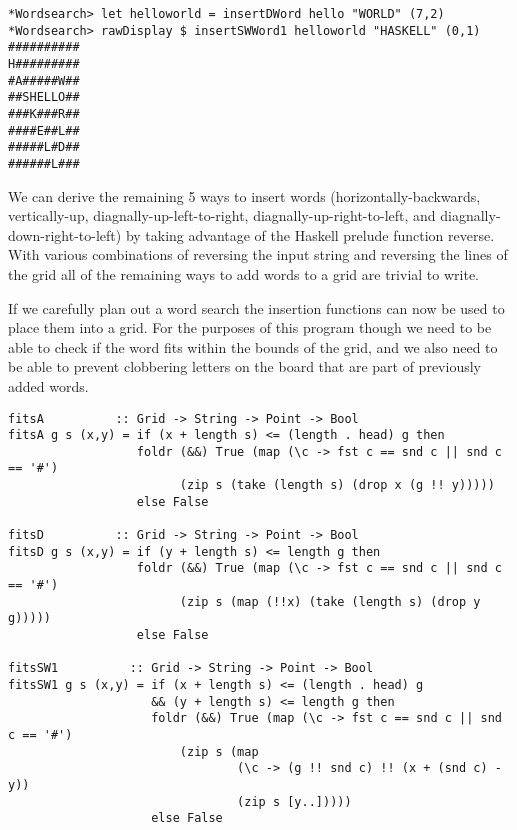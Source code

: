 \documentclass[12pt]{report}   %
\begin{document}
    \vspace{12pt}
    \pagebreak

    \begin{lstlisting}
*Wordsearch> let helloworld = insertDWord hello "WORLD" (7,2) 
*Wordsearch> rawDisplay $ insertSWWord1 helloworld "HASKELL" (0,1)
##########
H#########
#A#####W##
##SHELLO##
###K###R##
####E##L##
#####L#D##
######L###
    \end{lstlisting}

    \vspace{12pt}

    We can derive the remaining 5 ways to insert words (horizontally-backwards,
    vertically-up, diagnally-up-left-to-right, diagnally-up-right-to-left, and
    diagnally-down-right-to-left) by taking advantage of the Haskell prelude
    function reverse. With various combinations of reversing the input string
    and reversing the lines of the grid all of the remaining ways to add words
    to a grid are trivial to write.

    \vspace{12pt}

    If we carefully plan out a word search the insertion functions can now be
    used to place them into a grid. For the purposes of this program though we
    need to be able to check if the word fits within the bounds of the grid,
    and we also need to be able to prevent clobbering letters on the board
    that are part of previously added words.

    \vspace{12pt}

    \begin{lstlisting}
fitsA          :: Grid -> String -> Point -> Bool
fitsA g s (x,y) = if (x + length s) <= (length . head) g then
                  foldr (&&) True (map (\c -> fst c == snd c || snd c == '#') 
                        (zip s (take (length s) (drop x (g !! y)))))
                  else False

fitsD          :: Grid -> String -> Point -> Bool
fitsD g s (x,y) = if (y + length s) <= length g then
                  foldr (&&) True (map (\c -> fst c == snd c || snd c == '#') 
                        (zip s (map (!!x) (take (length s) (drop y g)))))
                  else False

fitsSW1          :: Grid -> String -> Point -> Bool
fitsSW1 g s (x,y) = if (x + length s) <= (length . head) g 
                    && (y + length s) <= length g then 
                    foldr (&&) True (map (\c -> fst c == snd c || snd c == '#') 
                        (zip s (map 
                                (\c -> (g !! snd c) !! (x + (snd c) - y)) 
                                (zip s [y..]))))
                    else False
    \end{lstlisting}
\end{document}
